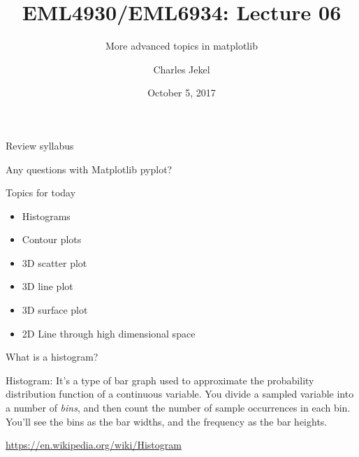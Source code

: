 \documentclass[10pt]{beamer}
\title{EML4930/EML6934: Lecture 06}
\subtitle{More advanced topics in matplotlib}
\date{October 5, 2017}
\author{Charles Jekel}
\begin{document}
\maketitle

\begin{frame}{Review syllabus}

\end{frame}

\begin{frame}{Any questions with Matplotlib pyplot?}

\end{frame}

\begin{frame}{Topics for today}

\begin{itemize}
\item Histograms
\item Contour plots
\item 3D scatter plot
\item 3D line plot
\item 3D surface plot
\item 2D Line through high dimensional space
\end{itemize}

\end{frame}

\begin{frame}{What is a histogram? }
	\begin{alertblock}{Histogram:}
		It's a type of bar graph used to approximate the probability distribution function of a continuous variable. You divide a sampled variable into a number of \textit{bins}, and then count the number of sample occurrences in each bin. You'll see the bins as the bar widths, and the frequency as the bar heights.
\end{alertblock}
\url{https://en.wikipedia.org/wiki/Histogram}
\end{frame}

\end{document}
